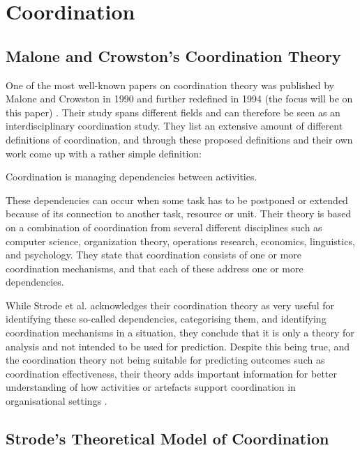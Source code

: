 \section{Coordination}


\subsection{Malone and Crowston's Coordination Theory}

One of the most well-known papers on coordination theory was published by Malone and Crowston in 1990 and further redefined in 1994 (the focus will be on this paper) \cite{Malone1994}. Their study spans different fields and can therefore be seen as an interdisciplinary coordination study. They list an extensive amount of different definitions of coordination, and through these proposed definitions and their own work come up with a rather simple definition:

\begin{fancyquotes}
Coordination is managing dependencies between activities.
\end{fancyquotes}

These dependencies can occur when some task has to be postponed or extended because of its connection to another task, resource or unit. Their theory is based on a combination of coordination from several different disciplines such as computer science, organization theory, operations research, economics, linguistics, and psychology. They state that coordination consists of one or more coordination mechanisms, and that each of these address one or more dependencies.

While Strode et al. acknowledges their coordination theory as very useful for identifying these so-called dependencies, categorising them, and identifying coordination mechanisms in a situation, they conclude that it is only a theory for analysis and not intended to be used for prediction. Despite this being true, and the coordination theory not being suitable for predicting outcomes such as coordination effectiveness, their theory adds important information for better understanding of how activities or artefacts support coordination in organisational settings \cite{Strode2012}.

\subsection{Strode's Theoretical Model of Coordination}

